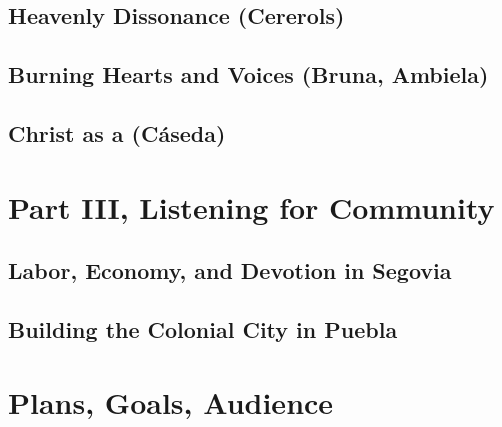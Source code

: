 \documentclass{vcbook-proposal}
\begin{document}
\subsection{Heavenly Dissonance (Cererols)}

\subsection{Burning Hearts and Voices (Bruna, Ambiela)}

\subsection{Christ as a  (Cáseda)}


\section{Part III, Listening for Community}

\subsection{Labor, Economy, and Devotion in Segovia}

\subsection{Building the Colonial City in Puebla}

\section{Plans, Goals, Audience}


\printbibliography
\end{document}
